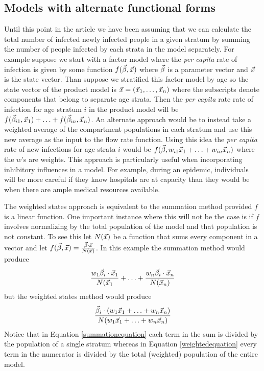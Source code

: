 \subsection{Models with alternate functional forms}\label{aff}
Until this point in the article we have been assuming that we can calculate the total number of infected newly infected people in a given stratum by summing the number of people infected by each strata in the model separately. For example suppose we start with a factor model where the \emph{per capita} rate of infection is given by some function $f(\vec{\beta}, \vec{x})$ where $\vec{\beta}$ is a parameter vector and $\vec{x}$ is the state vector. Than suppose we stratified this factor model by age so the state vector of the product model is $\vec{x} = (\vec{x}_1, \ldots, \vec{x}_n)$ where the subscripts denote components that belong to separate age strata. Then the \emph{per capita} rate rate of infection for age stratum $i$ in the product model will be $f(\vec{\beta}_{i1}, \vec{x}_1) + \ldots + f(\vec{\beta}_{in}, \vec{x}_n)$. An alternate approach would be to instead take a weighted average of the compartment populations in each stratum and use this new average as the input to the flow rate function. Using this idea the \emph{per capita} rate of new infections for age strata $i$ would be $f(\vec{\beta}, w_{i1}\vec{x}_1 + \ldots + w_{in}\vec{x}_n)$ where the $w$'s are weights. This approach is particularly useful when incorporating inhibitory influences in a model. For example, during an epidemic, individuals will be more careful if they know hospitals are at capacity than they would be when there are ample medical resources available. 

The weighted states approach is equivalent to the summation method provided $f$ is a linear function. One important instance where this will not be the case is if $f$ involves normalizing by the total population of the model and that population is not constant. To see this let $N(\vec{x})$ be a function that sums every component in a vector and let $f(\vec{\beta}, \vec{x}) = \frac{\vec{\beta} \cdot \vec{x}}{N(\vec{x})}$. In this example the summation method would produce 
\begin{equation}\label{summationequation}
\frac{w_1\vec{\beta}_{i}\cdot \vec{x}_1}{N(\vec{x}_1} + \ldots + \frac{w_n\vec{\beta}_{i}\cdot \vec{x}_n}{N(\vec{x}_n)}
\end{equation}\label{weightedequation}
but the weighted states method would produce
\begin{equation}
    \frac{\vec{\beta}_i \cdot (w_1\vec{x}_1+\ldots + w_n\vec{x}_n)}{N(w_1\vec{x}_1+\ldots + w_n\vec{x}_n)}
\end{equation}
Notice that in Equation \ref{summationequation} each term in the sum is divided by the population of a single stratum whereas in Equation \ref{weightedequation} every term in the numerator is divided by the total (weighted) population of the entire model. 

